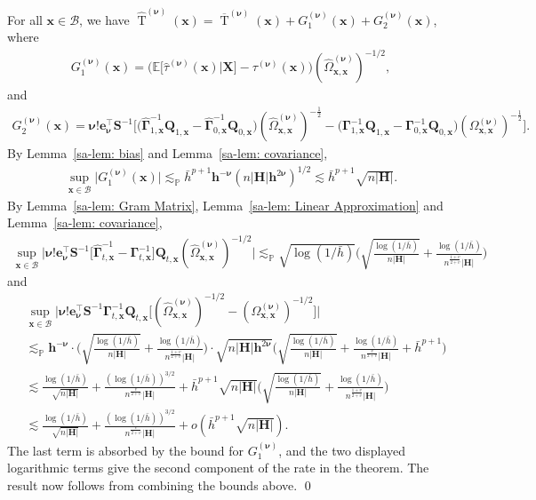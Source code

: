 \documentclass[10pt]{article}
\DeclareMathOperator{\Tstat}{T}
\newcommand{\E}{\mathbb{E}}
\newcommand{\lessp}{\lesssim_{\mathbb{P}}}
\newcommand{\be}{\mathbf{e}}
\newcommand{\bh}{\mathbf{h}}
\newcommand{\bH}{\mathbf{H}}
\newcommand{\bQ}{\mathbf{Q}}
\newcommand{\bS}{\mathbf{S}}
\newcommand{\bx}{\mathbf{x}}
\newcommand{\bX}{\mathbf{X}}
\newcommand{\bnu}{\boldsymbol{\nu}}
\newcommand{\bGamma}{\boldsymbol{\Gamma}}
\newcommand{\hGammap}{\widehat{\boldsymbol{\Gamma}}_{1, \bx}}
\newcommand{\hGamman}{\widehat{\boldsymbol{\Gamma}}_{0, \bx}}
\newcommand{\Gammap}{\boldsymbol{\Gamma}_{1, \bx}}
\newcommand{\Gamman}{\boldsymbol{\Gamma}_{0, \bx}}
\newcommand{\B}{\mathcal{B}}
\begin{document}
For all $\bx \in \B$, we have $\widehat{\Tstat}^{(\bnu)}(\bx) = \overline{\Tstat}^{(\bnu)}(\bx) + G_1^{(\bnu)}(\bx) +  G_2^{(\bnu)}(\bx)$, where
\begin{align*}
  G_1^{(\bnu)}(\bx)
  = \Big(\E\big[\widehat{\tau}^{(\bnu)}(\bx) \big| \bX \big] - \tau^{(\bnu)}(\bx)\Big) (\widehat{\Omega}_{\bx,\bx}^{(\bnu)})^{-1/2},
\end{align*}
and
\begin{align*}
  G_2^{(\bnu)}(\bx)
  = \bnu!\be_{\bnu}^{\top}\bS^{-1} \Big[\big(\hGammap^{-1} \bQ_{1, \bx}- \hGamman^{-1} \bQ_{0, \bx}\big) (\widehat{\Omega}_{\bx,\bx}^{(\bnu)})^{-\frac{1}{2}} - \big(\Gammap^{-1} \bQ_{1, \bx}- \Gamman^{-1} \bQ_{0, \bx}\big)(\Omega_{\bx,\bx}^{(\bnu)})^{-\frac{1}{2}}\Big].
\end{align*}
By Lemma~\ref{sa-lem: bias} and Lemma~\ref{sa-lem: covariance},
\begin{align*}
    \sup_{\bx \in \B} \big|G_1^{(\bnu)}(\bx)\big| \lessp \bar{h}^{p+1}\bh^{-\bnu} (n |\bH|\bh^{2\bnu})^{1/2} \lesssim \bar{h}^{p+1}\sqrt{n |\bH|}.
\end{align*}
By Lemma~\ref{sa-lem: Gram Matrix}, Lemma~\ref{sa-lem: Linear Approximation} and Lemma~\ref{sa-lem: covariance},
\begin{align*}
    \sup_{\bx \in \B} \Big|\bnu!\be_{\bnu}^{\top} \bS^{-1} \big[\widehat{\bGamma}_{t,\bx}^{-1} - \bGamma_{t,\bx}^{-1}\big] \bQ_{t,\bx} (\widehat{\Omega}_{\bx,\bx}^{(\bnu)})^{-1/2}\Big|
    \lessp \sqrt{\log(1/\bar{h})} \bigg(\sqrt{\frac{\log(1/\bar{h})}{n |\bH|}} + \frac{\log(1/\bar{h})}{n^{\frac{1 + v}{2+v}}|\bH|}\bigg)
\end{align*}
and
\begin{align*}
    & \sup_{\bx \in \B} \Big|\bnu!\be_{\bnu}^{\top} \bS^{-1} \bGamma_{t,\bx}^{-1} \bQ_{t,\bx} \Big[(\widehat{\Omega}_{\bx,\bx}^{(\bnu)})^{-1/2} - (\Omega_{\bx,\bx}^{(\bnu)})^{-1/2} \Big] \Big| \\
    & \lessp \bh^{-\bnu} \cdot \bigg(\sqrt{\frac{\log(1/\bar{h})}{n |\bH|}}  + \frac{\log(1/\bar{h})}{n^{\frac{1+v}{2+v}}|\bH|} \bigg) \cdot \sqrt{n|\bH|\bh^{2\bnu}} \bigg(\sqrt{\frac{\log(1/\bar{h})}{n |\bH|}}  + \frac{\log(1/\bar{h})}{n^{\frac{v}{2+v}}|\bH|} + \bar{h}^{p+1}\bigg) \\
    & \lesssim \frac{\log(1/\bar{h})}{\sqrt{n |\bH|}} + \frac{(\log(1/\bar{h}))^{3/2}}{n^{\frac{v}{2+v}}|\bH|}
      + \bar{h}^{p+1}\sqrt{n|\bH|}\bigg(\sqrt{\frac{\log(1/\bar{h})}{n |\bH|}}  + \frac{\log(1/\bar{h})}{n^{\frac{1+v}{2+v}}|\bH|} \bigg) \\
    & \lesssim \frac{\log(1/\bar{h})}{\sqrt{n |\bH|}} + \frac{(\log(1/\bar{h}))^{3/2}}{n^{\frac{v}{2+v}}|\bH|} + o(\bar{h}^{p+1}\sqrt{n |\bH|}).
\end{align*}
The last term is absorbed by the bound for $G_1^{(\bnu)}$, and the two displayed logarithmic terms give the second component of the rate in the theorem.
The result now follows from combining the bounds above.
\qed
\end{document}
